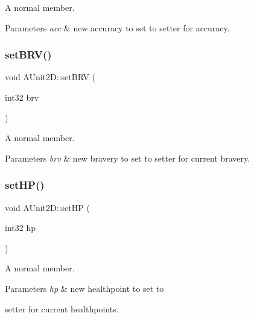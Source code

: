 A normal member. 


\begin{DoxyParams}{Parameters}
{\em acc} & new accuracy to set to setter for accuracy. \\
\hline
\end{DoxyParams}
\hypertarget{class_a_unit2_d_a6a1ed9c8a68c9954bb88c58539250f87}{}\label{class_a_unit2_d_a6a1ed9c8a68c9954bb88c58539250f87} 
\subsubsection{\texorpdfstring{set\+B\+R\+V()}{setBRV()}}
{\footnotesize\ttfamily void A\+Unit2\+D\+::set\+B\+RV (\begin{DoxyParamCaption}\item[{int32}]{brv }\end{DoxyParamCaption})}



A normal member. 


\begin{DoxyParams}{Parameters}
{\em brv} & new bravery to set to setter for current bravery. \\
\hline
\end{DoxyParams}
\hypertarget{class_a_unit2_d_a60a8c2a02713d1fb838757a2b74c0d5b}{}\label{class_a_unit2_d_a60a8c2a02713d1fb838757a2b74c0d5b} 
\subsubsection{\texorpdfstring{set\+H\+P()}{setHP()}}
{\footnotesize\ttfamily void A\+Unit2\+D\+::set\+HP (\begin{DoxyParamCaption}\item[{int32}]{hp }\end{DoxyParamCaption})}



A normal member. 


\begin{DoxyParams}{Parameters}
{\em hp} & new healthpoint to set to\\
\hline
\end{DoxyParams}
setter for current healthpoints. \hypertarget{class_a_unit2_d_a30c4c53f8789064bb9fc7b7d8703ae35}{}\label{class_a_unit2_d_a30c4c53f8789064bb9fc7b7d8703ae35} 
